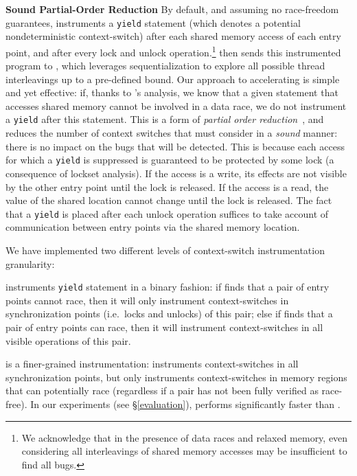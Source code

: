 \noindent\textbf{Sound Partial-Order Reduction }
%
By default, and assuming no race-freedom guarantees, \whoop instruments a \texttt{yield} statement (which denotes a potential nondeterministic context-switch) after each shared memory access of each entry point, and after every lock and unlock operation.\footnote{We acknowledge that in the presence of data races and relaxed memory, even considering all interleavings of shared memory accesses may be insufficient to find all bugs.} \whoop then sends this instrumented program to \corral, which leverages sequentialization to explore all possible thread interleavings up to a pre-defined bound. Our approach to accelerating \corral is simple and yet effective: if, thanks to \whoop's analysis, we know that a given statement that accesses shared memory cannot be involved in a data race, we do not instrument a \texttt{yield} after this statement.  This is a form of \emph{partial order reduction}~\cite{DBLP:books/sp/Godefroid96}, and reduces the number of context switches that \corral must consider in a \emph{sound} manner: there is no impact on the bugs that will be detected.  This is because each access for which a \texttt{yield} is suppressed is guaranteed to be protected by some lock (a consequence of lockset analysis).  If the access is a write, its effects are not visible by the other entry point until the lock is released.  If the access is a read, the value of the shared location cannot change until the lock is released.  The fact that a \texttt{yield} is placed after each unlock operation suffices to take account of communication between entry points via the shared memory location.

We have implemented two different levels of context-switch instrumentation granularity:

\yieldcoarse instruments \texttt{yield} statement in a binary fashion: if \whoop
finds that a pair of entry points cannot race, then it will only instrument
context-switches in synchronization points (i.e.\ locks and unlocks) of this pair; else if \whoop finds
that a pair of entry points can race, then it will instrument context-switches
in all visible operations of this pair.

\yieldmr is a finer-grained instrumentation: \whoop instruments context-switches
in all synchronization points, but only instruments context-switches in memory
regions that can potentially race (regardless if a pair has not been fully
verified as race-free). In our experiments (see \S\ref{evaluation}),
\yieldmr performs significantly faster than \yieldcoarse.

